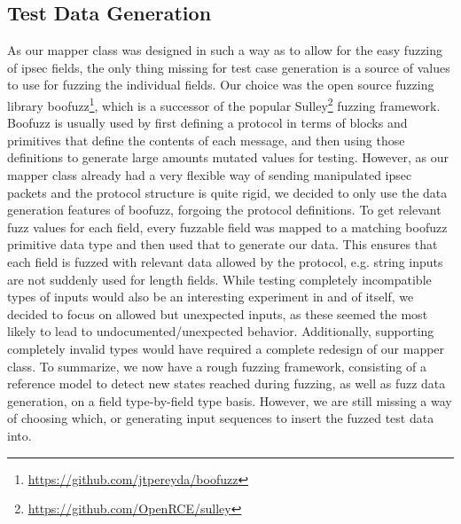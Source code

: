 \subsection{Test Data Generation} \label{subsec:data_gen}
As our mapper class was designed in such a way as to allow for the easy fuzzing of \ac{ipsec} fields, the only thing missing for test case generation is a source of values to use for fuzzing the individual fields. Our choice was the open source fuzzing library boofuzz\footnote{\url{https://github.com/jtpereyda/boofuzz}}, which is a successor of the popular Sulley\footnote{\url{https://github.com/OpenRCE/sulley}} fuzzing framework. Boofuzz is usually used by first defining a protocol in terms of blocks and primitives that define the contents of each message, and then using those definitions to generate large amounts mutated values for testing. However, as our mapper class already had a very flexible way of sending manipulated \ac{ipsec} packets and the protocol structure is quite rigid, we decided to only use the data generation features of boofuzz, forgoing the protocol definitions. To get relevant fuzz values for each field, every fuzzable field was mapped to a matching boofuzz primitive data type and then used that to generate our data. This ensures that each field is fuzzed with relevant data allowed by the protocol, e.g. string inputs are not suddenly used for length fields. While testing completely incompatible types of inputs would also be an interesting experiment in and of itself, we decided to focus on allowed but unexpected inputs, as these seemed the most likely to lead to undocumented/unexpected behavior. Additionally, supporting completely invalid types would have required a complete redesign of our mapper class. To summarize, we now have a rough fuzzing framework, consisting of a reference model to detect new states reached during fuzzing, as well as fuzz data generation, on a field type-by-field type basis. However, we are still missing a way of choosing which, or generating input sequences to insert the fuzzed test data into. 


